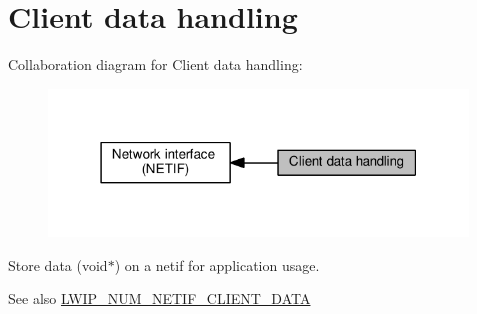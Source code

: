 \hypertarget{group__netif__cd}{}\section{Client data handling}
\label{group__netif__cd}
Collaboration diagram for Client data handling\+:
\nopagebreak
\begin{figure}[H]
\begin{center}
\leavevmode
\includegraphics[width=316pt]{group__netif__cd}
\end{center}
\end{figure}
Store data (void$\ast$) on a netif for application usage. \begin{DoxySeeAlso}{See also}
\hyperlink{openmote-cc2538_2lwip_2test_2unit_2lwipopts_8h_a94a35212616f9a9aae5c98741612b936}{L\+W\+I\+P\+\_\+\+N\+U\+M\+\_\+\+N\+E\+T\+I\+F\+\_\+\+C\+L\+I\+E\+N\+T\+\_\+\+D\+A\+TA} 
\end{DoxySeeAlso}
